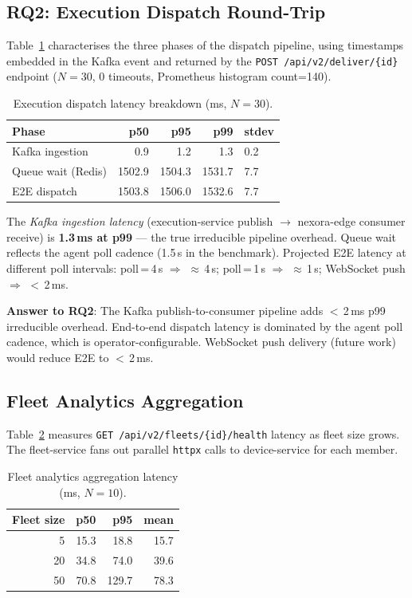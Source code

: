 \documentclass[twocolumn,smallextended]{svjour3}
\begin{document}
\subsection{RQ2: Execution Dispatch Round-Trip}
\label{sec:dispatch-bench}

Table~\ref{tab:dispatch} characterises the three phases of the dispatch pipeline,
using timestamps embedded in the Kafka event and returned by the
\texttt{POST /api/v2/deliver/\{id\}} endpoint ($N\!=\!30$, 0 timeouts, Prometheus
histogram count=140).

\begin{table}[t]
\centering
\caption{Execution dispatch latency breakdown (ms, $N\!=\!30$).}
\label{tab:dispatch}
\begin{tabular}{@{}lrrrl@{}}
\toprule
Phase & p50 & p95 & p99 & stdev \\
\midrule
Kafka ingestion & 0.9 & 1.2 & 1.3 & 0.2 \\
Queue wait (Redis) & 1502.9 & 1504.3 & 1531.7 & 7.7 \\
E2E dispatch & 1503.8 & 1506.0 & 1532.6 & 7.7 \\
\bottomrule
\end{tabular}
\end{table}

The \emph{Kafka ingestion latency} (execution-service publish $\rightarrow$
nexora-edge consumer receive) is \textbf{1.3\,ms at p99} — the true irreducible
pipeline overhead. Queue wait reflects the agent poll cadence (1.5\,s in the
benchmark). Projected E2E latency at different poll intervals:
poll\,=\,4\,s $\Rightarrow$ $\approx$\,4\,s; poll\,=\,1\,s $\Rightarrow$ $\approx$\,1\,s;
WebSocket push $\Rightarrow$ $<$\,2\,ms.

\textbf{Answer to RQ2}: The Kafka publish-to-consumer pipeline adds $<$\,2\,ms p99
irreducible overhead. End-to-end dispatch latency is dominated by the agent poll
cadence, which is operator-configurable. WebSocket push delivery (future work) would
reduce E2E to $<$\,2\,ms.

\subsection{Fleet Analytics Aggregation}
\label{sec:bench-fleet}

Table~\ref{tab:fleet} measures \texttt{GET /api/v2/fleets/\{id\}/health}
latency as fleet size grows. The fleet-service fans out parallel
\texttt{httpx} calls to device-service for each member.

\begin{table}[t]
\centering
\caption{Fleet analytics aggregation latency (ms, $N\!=\!10$).}
\label{tab:fleet}
\begin{tabular}{@{}rrrr@{}}
\toprule
Fleet size & p50 & p95 & mean \\
\midrule
5  & 15.3 & 18.8 & 15.7 \\
20 & 34.8 & 74.0 & 39.6 \\
50 & 70.8 & 129.7 & 78.3 \\
\bottomrule
\end{tabular}
\end{table}
\end{document}
